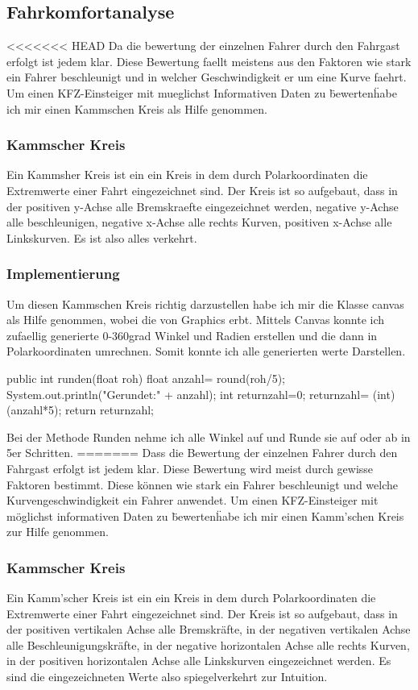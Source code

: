 \subsection{Fahrkomfortanalyse}

<<<<<<< HEAD
Da die bewertung der einzelnen Fahrer durch den Fahrgast erfolgt ist jedem klar.
Diese Bewertung faellt meistens aus den Faktoren wie stark ein Fahrer beschleunigt und in welcher Geschwindigkeit er um eine Kurve faehrt.
Um einen KFZ-Einsteiger mit mueglichst Informativen Daten zu \"bewerten\" habe ich mir einen Kammschen Kreis als Hilfe genommen.

\subsubsection{Kammscher Kreis }
Ein Kammsher Kreis ist ein ein Kreis in dem durch Polarkoordinaten die Extremwerte einer Fahrt eingezeichnet sind.
Der Kreis ist so aufgebaut, dass in der positiven y-Achse alle Bremskraefte eingezeichnet werden, negative y-Achse alle beschleunigen,
negative x-Achse alle rechts Kurven, positiven x-Achse alle Linkskurven.
Es ist also alles verkehrt.

\subsubsection{Implementierung}
Um diesen Kammschen Kreis richtig darzustellen habe ich mir die Klasse canvas als Hilfe genommen, wobei die von Graphics erbt.
Mittels Canvas konnte ich zufaellig generierte 0-360grad Winkel und Radien erstellen und die dann in Polarkoordinaten umrechnen.
Somit konnte ich alle generierten werte Darstellen. 

public int runden(float roh){
	float anzahl= round(roh/5);
	System.out.println("Gerundet:" + anzahl);
	int returnzahl=0;
	returnzahl= (int) (anzahl*5);
	return returnzahl;
}

Bei der Methode Runden nehme ich alle Winkel auf und Runde sie auf oder ab in 5er Schritten.
=======
Dass die Bewertung der einzelnen Fahrer durch den Fahrgast erfolgt ist jedem klar.
Diese Bewertung wird meist durch gewisse Faktoren bestimmt. Diese können wie stark ein Fahrer beschleunigt und welche Kurvengeschwindigkeit ein Fahrer anwendet.
Um einen KFZ-Einsteiger mit möglichst informativen Daten zu \"bewerten\" habe ich mir einen Kamm'schen Kreis zur Hilfe genommen.

\subsubsection{Kammscher Kreis}
Ein Kamm'scher Kreis ist ein ein Kreis in dem durch Polarkoordinaten die Extremwerte einer Fahrt eingezeichnet sind.
Der Kreis ist so aufgebaut, dass in der positiven vertikalen Achse alle Bremskräfte, in der negativen vertikalen Achse alle Beschleunigungskräfte,
in der negative horizontalen Achse alle rechts Kurven, in der positiven horizontalen Achse alle Linkskurven eingezeichnet werden. 
Es sind die eingezeichneten Werte also spiegelverkehrt zur Intuition.

